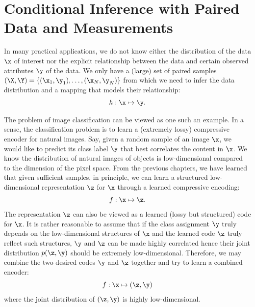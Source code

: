 \documentclass[../../book-main.tex]{subfiles}
\begin{document}
\section{Conditional Inference with Paired Data and Measurements}
In many practical applications, we do not know either the distribution of the data $\x$ of interest nor the explicit relationship between the data and certain observed attributes $\y$ of the data. We only have  a (large) set of paired samples $(\X, \Y) = \{ (\x_1, \y_1), \ldots, (\x_N, \y_N) \}$ from which we need to infer the data distribution and a mapping that models their relationship:
\begin{equation}
  h: \x \mapsto \y.
\end{equation}

The problem of image classification can be viewed as one such an example. In a sense, the classification problem is to learn a (extremely lossy) compressive encoder for natural images. Say, given a random sample of an image $\x$, we would like to predict its class label $\y$ that best correlates the content in $\x$. We know the distribution of natural images of objects is low-dimensional compared to the dimension of the pixel space. From the previous chapters, we have learned that given sufficient samples, in principle, we can learn a structured low-dimensional representation $\z$ for $\x$ through a learned compressive encoding:
\begin{equation}
    f: \x \mapsto \z. 
\end{equation}
The representation $\z$ can also be viewed as a learned (lossy but structured) code for $\x$. It is rather reasonable to assume that if the class assignment $\y$  truly depends on the low-dimensional  structures of $\x$ and the learned code $\z$ truly reflect such structures, $\y$ and $\z$ can be made highly correlated hence their joint distribution $p(\z, \y)$ should be extremely low-dimensional. Therefore, we may combine the two desired codes $\y$ and $\z$ together and try to learn a combined encoder:
\begin{equation}
    f: \x \mapsto (\z, \y) 
\end{equation}
where the joint distribution of $(\z, \y)$ is highly low-dimensional. 
\end{document}
